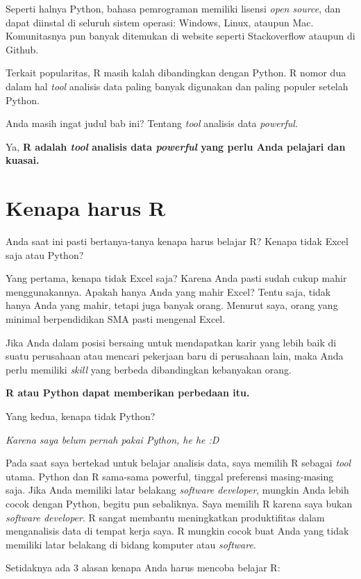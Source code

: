 \documentclass[openany]{book}
\begin{document}
Seperti halnya Python, bahasa pemrograman memiliki lisensi \emph{open
source}, dan dapat diinstal di seluruh sistem operasi: Windows, Linux,
ataupun Mac. Komunitasnya pun banyak ditemukan di website seperti
Stackoverflow ataupun di Github.

Terkait popularitas, R masih kalah dibandingkan dengan Python. R nomor
dua dalam hal \emph{tool} analisis data paling banyak digunakan dan
paling populer setelah Python.

Anda masih ingat judul bab ini? Tentang \emph{tool} analisis data
\emph{powerful}.

Ya, \textbf{R adalah \emph{tool} analisis data \emph{powerful} yang
perlu Anda pelajari dan kuasai.}

\section{Kenapa harus R}\label{kenapa-harus-r}

Anda saat ini pasti bertanya-tanya kenapa harus belajar R? Kenapa tidak
Excel saja atau Python?

Yang pertama, kenapa tidak Excel saja? Karena Anda pasti sudah cukup
mahir menggunakannya. Apakah hanya Anda yang mahir Excel? Tentu saja,
tidak hanya Anda yang mahir, tetapi juga banyak orang. Menurut saya,
orang yang minimal berpendidikan SMA pasti mengenal Excel.

Jika Anda dalam posisi bersaing untuk mendapatkan karir yang lebih baik
di suatu perusahaan atau mencari pekerjaan baru di perusahaan lain, maka
Anda perlu memiliki \emph{skill} yang berbeda dibandingkan kebanyakan
orang.

\textbf{R atau Python dapat memberikan perbedaan itu.}

Yang kedua, kenapa tidak Python?

\emph{Karena saya belum pernah pakai Python, he he :D}

Pada saat saya bertekad untuk belajar analisis data, saya memilih R
sebagai \emph{tool} utama. Python dan R sama-sama powerful, tinggal
preferensi masing-masing saja. Jika Anda memiliki latar belakang
\emph{software developer}, mungkin Anda lebih cocok dengan Python,
begitu pun sebaliknya. Saya memilih R karena saya bukan \emph{software
developer}. R sangat membantu meningkatkan produktifitas dalam
menganalisis data di tempat kerja saya. R mungkin cocok buat Anda yang
tidak memiliki latar belakang di bidang komputer atau \emph{software}.

Setidaknya ada 3 alasan kenapa Anda harus mencoba belajar R:
\end{document}
